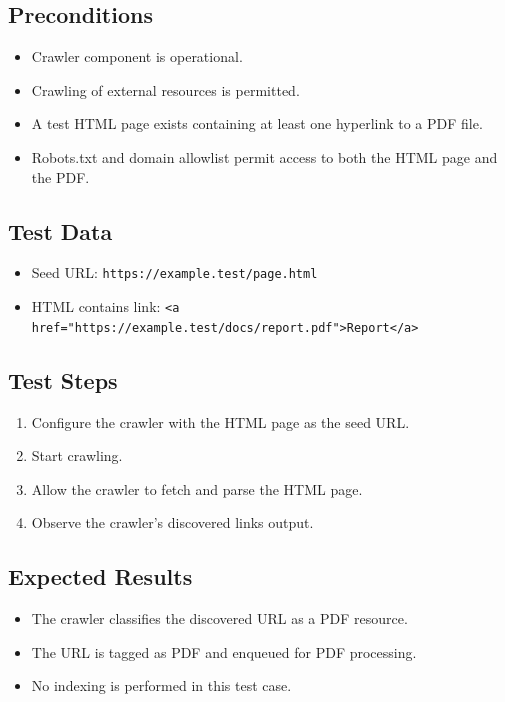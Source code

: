 \documentclass{article}
\begin{document}
\subsection*{Preconditions}
\begin{itemize}
  \item Crawler component is operational.
  \item Crawling of external resources is permitted.
  \item A test HTML page exists containing at least one hyperlink to a PDF file.
  \item Robots.txt and domain allowlist permit access to both the HTML page and the PDF.
\end{itemize}

\subsection*{Test Data}
\begin{itemize}
  \item Seed URL: \texttt{https://example.test/page.html}
  \item HTML contains link: \texttt{<a href="https://example.test/docs/report.pdf">Report</a>}
\end{itemize}

\subsection*{Test Steps}
\begin{enumerate}
  \item Configure the crawler with the HTML page as the seed URL.
  \item Start crawling.
  \item Allow the crawler to fetch and parse the HTML page.
  \item Observe the crawler's discovered links output.
\end{enumerate}

\subsection*{Expected Results}
\begin{itemize}
  \item The crawler classifies the discovered URL as a PDF resource.
  \item The URL is tagged as PDF and enqueued for PDF processing.
  \item No indexing is performed in this test case.
\end{itemize}
\end{document}

